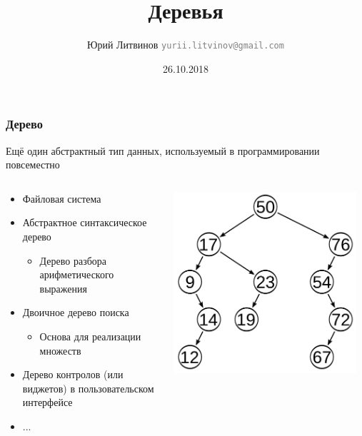 \documentclass[xetex,mathserif,serif]{beamer}
\title{Деревья}
\author[Юрий Литвинов]{Юрий Литвинов \newline \textcolor{gray}{\small\texttt{yurii.litvinov@gmail.com}}}
\date{26.10.2018}
\begin{document}
	
	\frame{\titlepage}
	
	\begin{frame}
		\frametitle{Дерево}
		Ещё один абстрактный тип данных, используемый в программировании повсеместно
		\begin{columns}
			\begin{column}{0.55\textwidth}
				\begin{itemize}
					\item Файловая система
					\item Абстрактное синтаксическое дерево
					\begin{itemize}
						\item Дерево разбора арифметического выражения
					\end{itemize}
					\item Двоичное дерево поиска
					\begin{itemize}
						\item Основа для реализации множеств
					\end{itemize}
					\item Дерево контролов (или виджетов) в пользовательском интерфейсе
					\item ...
				\end{itemize}
			\end{column}
			\begin{column}{0.45\textwidth}
				\begin{center}
					\includegraphics[width=0.95\textwidth]{tree.png}
				\end{center}
			\end{column}
		\end{columns}
	\end{frame}
\end{document}
